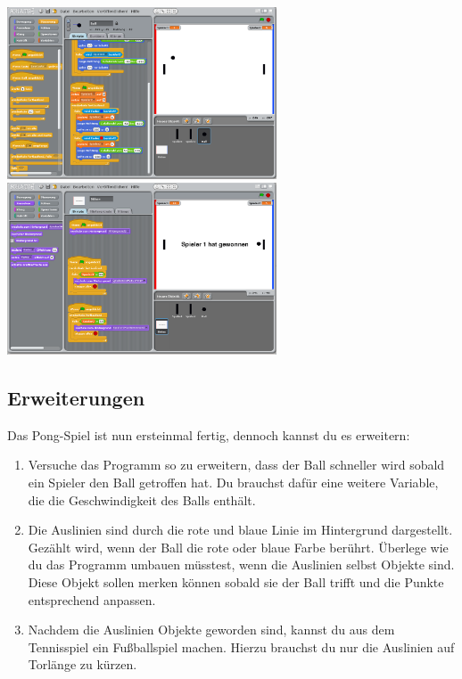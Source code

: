 \includegraphics[width=0.6\textwidth]{images/aufgabe5_pong_spieler_variablen_2.png}
\includegraphics[width=0.6\textwidth]{images/aufgabe5_pong_spieler_variablen_3.png}

\subsection{Erweiterungen}
Das Pong-Spiel ist nun ersteinmal fertig, dennoch kannst du es erweitern:

\begin{enumerate}
\item Versuche das Programm so zu erweitern, dass der Ball schneller wird sobald ein Spieler den Ball getroffen hat. Du brauchst dafür eine weitere Variable, die die Geschwindigkeit des Balls enthält.
\item Die Auslinien sind durch die rote und blaue Linie im Hintergrund dargestellt. Gezählt wird, wenn der Ball die rote oder blaue Farbe berührt. Überlege wie du das Programm umbauen müsstest, wenn die Auslinien selbst Objekte sind. Diese Objekt sollen merken können sobald sie der Ball trifft und die Punkte entsprechend anpassen.
\item Nachdem die Auslinien Objekte geworden sind, kannst du aus dem Tennisspiel ein Fußballspiel machen. Hierzu brauchst du nur die Auslinien auf Torlänge zu kürzen. 
\end{enumerate}









